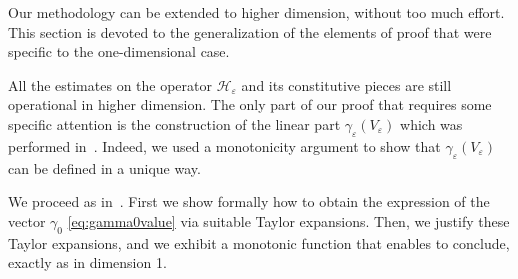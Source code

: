 \documentclass[10pt]{amsart}
\let\mathcal\mathscr
\theoremstyle{plain}
\theoremstyle{definition}
\renewcommand{\H}{\mathcal{H}_\eps}
\let\eps\varepsilon
\begin{document}
Our methodology can be extended to higher dimension, without too much effort.
This section is devoted to the generalization of the elements of proof that were specific to the one-dimensional case.

All the estimates on the operator $\H$ and its constitutive pieces are still operational in higher dimension. The only part of our proof that requires some specific attention is the construction of the linear part $\gamma_\eps(V_\eps)$ which was performed in~. Indeed, we used a monotonicity argument to show that $\gamma_\eps(V_\eps)$ can be defined in a unique way.

We proceed as in~.
First we show formally how to obtain the expression of the vector $\gamma_0$ \eqref{eq:gamma0value} via suitable Taylor expansions. Then, we justify these Taylor expansions, and we exhibit a monotonic function that enables to conclude, exactly as in dimension 1.
\end{document}
